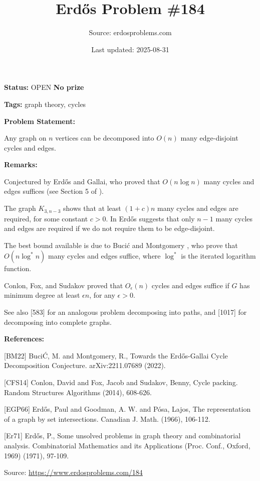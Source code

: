 \documentclass{article}
\title{Erd\H{o}s Problem \#184}
\date{Last updated: 2025-08-31}
\author{Source: erdosproblems.com}
\begin{document}
\maketitle

\noindent\textbf{Status:} OPEN \quad \textbf{No prize}

\noindent\textbf{Tags:} graph theory, cycles

\medskip
\noindent\textbf{Problem Statement:}

Any graph on $n$ vertices can be decomposed into $O(n)$ many edge-disjoint cycles and edges.

\bigskip
\noindent\textbf{Remarks:}

Conjectured by Erd\H{o}s and Gallai, who proved that $O(n\log n)$ many cycles and edges suffices (see Section 5 of \cite{EGP66}). 

The graph $K_{3,n-3}$ shows that at least $(1+c)n$ many cycles and edges are required, for some constant $c>0$. In \cite{Er71} Erd\H{o}s suggests that only $n-1$ many cycles and edges are required if we do not require them to be edge-disjoint.

The best bound available is due to Buci\'{c} and Montgomery \cite{BM22}, who prove that $O(n\log^*n)$ many cycles and edges suffice, where $\log^*$ is the iterated logarithm function.

Conlon, Fox, and Sudakov \cite{CFS14} proved that $O_\epsilon(n)$ cycles and edges suffice if $G$ has minimum degree at least $\epsilon n$, for any $\epsilon>0$.

See also [583] for an analogous problem decomposing into paths, and [1017] for decomposing into complete graphs.

\bigskip
\noindent\textbf{References:}

[BM22] Buci\'C, M. and Montgomery, R., Towards the Erd\H{o}s-Gallai Cycle Decomposition Conjecture. arXiv:2211.07689 (2022).
 
 [CFS14] Conlon, David and Fox, Jacob and Sudakov, Benny, Cycle packing. Random Structures Algorithms (2014), 608-626.
 
 [EGP66] Erd\H{o}s, Paul and Goodman, A. W. and P\'{o}sa, Lajos, The representation of a graph by set intersections. Canadian J. Math. (1966), 106-112.
 
 [Er71] Erd\H{o}s, P., Some unsolved problems in graph theory and combinatorial analysis. Combinatorial Mathematics and its Applications (Proc.
Conf., Oxford, 1969) (1971), 97-109.

\bigskip
\noindent\small{Source: \url{https://www.erdosproblems.com/184}}
\end{document}
